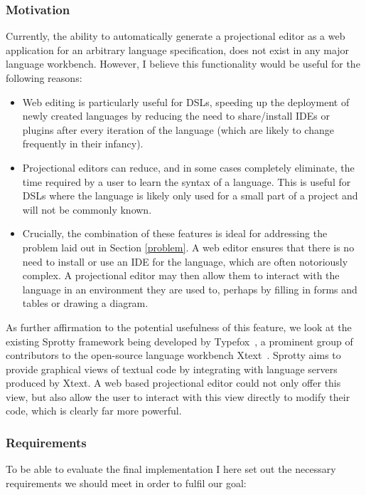 \documentclass{article}
\begin{document}
\subsubsection{Motivation}\label{motivation}
Currently, the ability to automatically generate a projectional editor as a web application for an arbitrary language specification, does not exist in any major  language workbench. However, I believe this functionality would be useful for the following reasons:
\begin{itemize}
\item Web editing is particularly useful for DSLs, speeding up the deployment of newly created languages by reducing the need to share/install IDEs or plugins after every iteration of the language (which are likely to change frequently in their infancy). 
\item Projectional editors can reduce, and in some cases completely eliminate, the time required by a user to learn the syntax of a language. This is useful for DSLs where the language is likely only used for a small part of a project and will not be commonly known.
\item Crucially, the combination of these features is ideal for addressing the problem laid out in Section \ref{problem}. A web editor ensures that there is no need to install or use an IDE for the language, which are often notoriously complex. A projectional editor may then allow them to interact with the language in an environment they are used to, perhaps by filling in forms and tables or drawing a diagram.  
\end{itemize} 
As further affirmation to the potential usefulness of this feature, we look at the existing Sprotty framework being developed by Typefox~\cite{sprotty}, a prominent group of contributors to the open-source language workbench Xtext~\cite{xtext}. Sprotty aims to provide graphical views of textual code by integrating with language servers produced by Xtext. A web based projectional editor could not only offer this view, but also allow the user to interact with this view directly to modify their code, which is clearly far more powerful. 

\subsubsection{Requirements}\label{requirements}
To be able to evaluate the final implementation I here set out the necessary requirements we should meet in order to fulfil our goal: 
\end{document}
